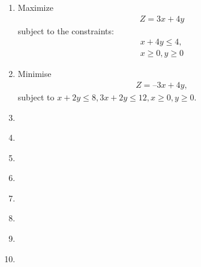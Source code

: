 \begin{enumerate}[label=\thesection.\arabic*,ref=\thesection.\theenumi]
\item Maximize
\label{12/12/1/1}
\begin{align}
	\label{eq:12/12/1/1/Obj_func}
	Z = 3x + 4y
\end{align}
subject to the constraints:
\begin{align}
	x+4y \leq 4, \\ 
	x \geq 0, y \geq 0
\end{align}
\solution 

\item Minimise 
\begin{align}
	Z = – 3x + 4 y,
\end{align}
subject to $x + 2y \leq 8, 3x + 2y \leq 12, x \geq 0, y \geq 0$.\\
\label{12/12/1/2}
\solution

\item
\label{12/12/1/3}

\item
\label{12/12/1/4}

\item
\label{12/12/1/5}
%
\item
\label{12/12/1/6}

\item
\label{12/12/1/7}

\item
\label{12/12/1/8}
%
\item
\label{12/12/1/9}

\item
\label{12/12/1/10}

\iffalse
\item
\label{12/12/1/1}

\fi
\end{enumerate}
